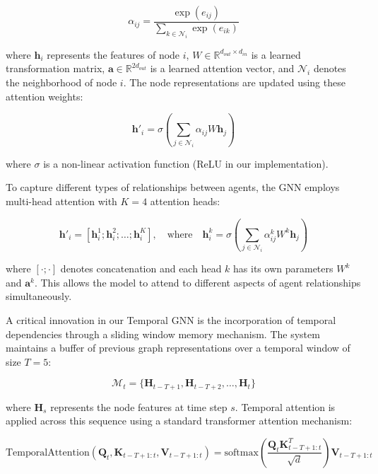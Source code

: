 \begin{equation}
    \alpha_{ij} = \frac{\exp(e_{ij})}{\sum_{k \in \mathcal{N}_i} \exp(e_{ik})}
\end{equation}

where $\mathbf{h}_i$ represents the features of node $i$, $W \in \mathbb{R}^{d_{out} \times d_{in}}$ is a learned transformation matrix, $\mathbf{a} \in \mathbb{R}^{2d_{out}}$ is a learned attention vector, and $\mathcal{N}_i$ denotes the neighborhood of node $i$. The node representations are updated using these attention weights:

\begin{equation}
    \mathbf{h}'_i = \sigma\left(\sum_{j \in \mathcal{N}_i} \alpha_{ij} W \mathbf{h}_j\right)
\end{equation}

where $\sigma$ is a non-linear activation function (ReLU in our implementation).

To capture different types of relationships between agents, the GNN employs multi-head attention with $K=4$ attention heads:

\begin{equation}
    \mathbf{h}'_i = [\mathbf{h}^1_i; \mathbf{h}^2_i; \ldots; \mathbf{h}^K_i], \quad \text{where} \quad \mathbf{h}^k_i = \sigma\left(\sum_{j \in \mathcal{N}_i} \alpha^k_{ij} W^k \mathbf{h}_j\right)
\end{equation}

where $[\cdot; \cdot]$ denotes concatenation and each head $k$ has its own parameters $W^k$ and $\mathbf{a}^k$. This allows the model to attend to different aspects of agent relationships simultaneously.

A critical innovation in our Temporal GNN is the incorporation of temporal dependencies through a sliding window memory mechanism. The system maintains a buffer of previous graph representations over a temporal window of size $T=5$:

\begin{equation}
    \mathcal{M}_t = \{\mathbf{H}_{t-T+1}, \mathbf{H}_{t-T+2}, \ldots, \mathbf{H}_t\}
\end{equation}

where $\mathbf{H}_s$ represents the node features at time step $s$. Temporal attention is applied across this sequence using a standard transformer attention mechanism:

\begin{equation}
    \text{TemporalAttention}(\mathbf{Q}_t, \mathbf{K}_{t-T+1:t}, \mathbf{V}_{t-T+1:t}) = \text{softmax}\left(\frac{\mathbf{Q}_t\mathbf{K}_{t-T+1:t}^T}{\sqrt{d}}\right)\mathbf{V}_{t-T+1:t}
\end{equation}

